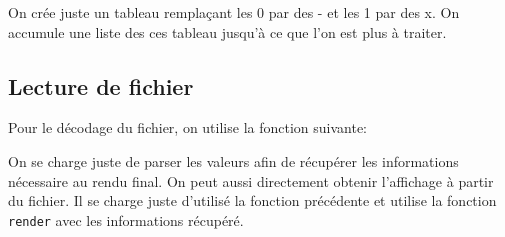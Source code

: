 \documentclass[10pt,a4paper]{article}
\begin{document}


On crée juste un tableau remplaçant les 0 par des - et les 1 par des x. On accumule une liste des ces tableau jusqu'à ce que l'on est plus  à traiter.\\

\subsection{Lecture de fichier}

Pour le décodage du fichier, on utilise la fonction suivante:



On se charge juste de parser les valeurs afin de récupérer les informations nécessaire au rendu final. On peut aussi directement obtenir l'affichage à partir du fichier. Il se charge juste d'utilisé la fonction précédente et utilise la fonction \texttt{render} avec les informations récupéré.


\end{document}
